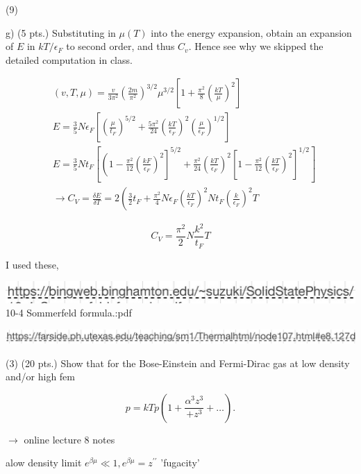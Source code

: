 \documentclass[10pt]{article}
\begin{document}
(9)

g) (5 pts.) Substituting in $\mu(T)$ into the energy expansion, obtain an expansion of $E$ in $k T / \epsilon_{F}$ to second order, and thus $C_{v}$. Hence see why we skipped the detailed computation in class.

$$
\begin{aligned}
& (v, T, \mu)=\frac{v}{3 \pi^{2}}\left(\frac{2 m}{\pi^{2}}\right)^{3 / 2} \mu^{3 / 2}\left[1+\frac{\pi^{2}}{8}\left(\frac{k T}{\mu}\right)^{2}\right] \\
& E=\frac{3}{5} N \epsilon_{F}\left[\left(\frac{\mu}{t_{F}}\right)^{5 / 2}+\frac{5 \pi^{2}}{24}\left(\frac{k T}{\epsilon_{F}}\right)^{2}\left(\frac{\mu}{\epsilon_{F}}\right)^{1 / 2}\right] \\
& E=\frac{3}{5} N t_{F}\left[\left(1-\frac{\pi^{2}}{12}\left(\frac{k F}{\epsilon_{F}}\right)^{2}\right]^{5 / 2}+\frac{\pi^{2}}{24}\left(\frac{k T}{\epsilon_{F}}\right)^{2}\left[1-\frac{\pi^{2}}{12}\left(\frac{k T}{\epsilon_{F}}\right)^{2}\right]^{1 / 2}\right] \\
& \longrightarrow C_{V}=\frac{\delta E}{\delta T}=2\left(\frac{3}{2} t_{F}+\frac{\pi^{2}}{4} N \epsilon_{F}\left(\frac{k T}{\epsilon_{F}}\right)^{2} N t_{F}\left(\frac{k}{\epsilon_{F}}\right)^{2} T\right.
\end{aligned}
$$

$$
C_{V}=\frac{\pi^{2}}{2} N \frac{k^{2}}{t_{F}} T
$$

I used these,

\includegraphics[max width=\textwidth, center]{2024_02_15_8bd07fd17573a85b0312g-12(1)}
10-4 Sommerfeld formula.:pdf

\begin{center}
\includegraphics[max width=\textwidth]{2024_02_15_8bd07fd17573a85b0312g-12}
\end{center}

(3) (20 pts.) Show that for the Bose-Einstein and Fermi-Dirac gas at low density and/or high fem

$$
p=k T p\left(1+\frac{\alpha^{3} z^{3}}{+z^{3}}+\ldots\right) .
$$

$\longrightarrow$ online lecture 8 notes

alow density limit $e^{\beta \mu} \ll 1, e^{\beta \mu}=z^{\prime \prime}$ 'fugacity'
\end{document}
